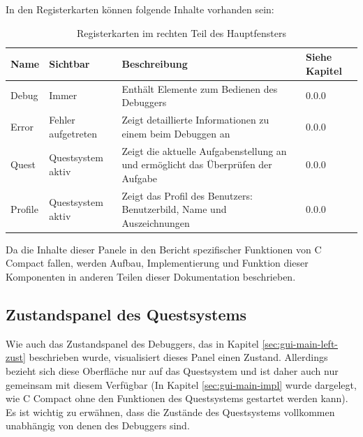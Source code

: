 In den Registerkarten können folgende Inhalte vorhanden sein:
\def\arraystretch{1.6}
\begin{table}
\begin{tabularx}{\columnwidth}{l|p{3cm}|p{6cm}|l}
\textbf{Name}&\textbf{Sichtbar}&\textbf{Beschreibung}&\textbf{Siehe Kapitel}\\
\hline
Debug&Immer&Enthält Elemente zum Bedienen des Debuggers&0.0.0\\%
Error&Fehler aufgetreten&Zeigt detaillierte Informationen zu einem beim Debuggen an&0.0.0\\%
Quest&Questsystem aktiv&Zeigt die aktuelle Aufgabenstellung an und ermöglicht das Überprüfen der Aufgabe&0.0.0\\%
Profile&Questsystem aktiv&Zeigt das Profil des Benutzers: Benutzerbild, Name und Auszeichnungen&0.0.0%
\end{tabularx}
\caption{Registerkarten im rechten Teil des Hauptfensters}\label{tab:gui-main-right-reg}
\end{table}

Da die Inhalte dieser Panele in den Bericht spezifischer Funktionen von C Compact fallen, werden Aufbau, Implementierung und Funktion dieser Komponenten in anderen Teilen dieser Dokumentation beschrieben.

\subsection{Zustandspanel des Questsystems}
Wie auch das Zustandspanel des Debuggers, das in Kapitel \ref{sec:gui-main-left-zust} beschrieben wurde, visualisiert dieses Panel einen Zustand. Allerdings bezieht sich diese Oberfläche nur auf das Questsystem und ist daher auch nur gemeinsam mit diesem Verfügbar (In Kapitel \ref{sec:gui-main-impl} wurde dargelegt, wie C Compact ohne den Funktionen des Questsystems gestartet werden kann). Es ist wichtig zu erwähnen, dass die Zustände des Questsystems vollkommen unabhängig von denen des Debuggers sind.

